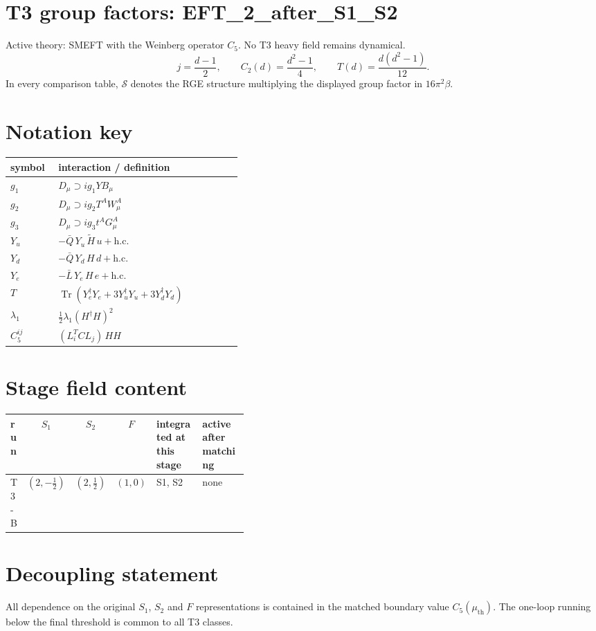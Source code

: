 \documentclass[9pt]{article}
\begin{document}
\section*{T3 group factors: EFT\_2\_after\_S1\_S2}
Active theory: SMEFT with the Weinberg operator $C_5$.  No T3 heavy field remains dynamical.
\[j=\frac{d-1}{2},\qquad C_2(d)=\frac{d^2-1}{4},\qquad T(d)=\frac{d(d^2-1)}{12}.\]
In every comparison table, $\mathcal{S}$ denotes the RGE structure multiplying the displayed group factor in $16\pi^2\beta$.
\section*{Notation key}
\begin{longtable}{@{}p{0.19\linewidth}p{0.73\linewidth}@{}}
\toprule
symbol & interaction / definition \\
\midrule
$g_1$ & $D_\mu\supset i g_1 Y B_\mu$ \\
$g_2$ & $D_\mu\supset i g_2 T^A W_\mu^A$ \\
$g_3$ & $D_\mu\supset i g_3 t^A G_\mu^A$ \\
$Y_u$ & $-\bar Q\,Y_u\,\widetilde H\,u+\mathrm{h.c.}$ \\
$Y_d$ & $-\bar Q\,Y_d\,H\,d+\mathrm{h.c.}$ \\
$Y_e$ & $-\bar L\,Y_e\,H\,e+\mathrm{h.c.}$ \\
$T$ & $\operatorname{Tr}\!\left(Y_e^\dagger Y_e+3Y_u^\dagger Y_u+3Y_d^\dagger Y_d\right)$ \\
$\lambda_1$ & $\frac12\lambda_1(H^\dagger H)^2$ \\
$C_5^{ij}$ & $(L_i^T C L_j)\,H H$ \\
\bottomrule
\end{longtable}
\section*{Stage field content}
\begin{longtable}{@{}lccc p{0.20\linewidth}p{0.20\linewidth}@{}}
\toprule
run & $S_1$ & $S_2$ & $F$ & integrated at this stage & active after matching \\
\midrule
T3-B & $(2,- \frac{1}{2})$ & $(2,\frac{1}{2})$ & $(1,0)$ & S1, S2 & none \\
\bottomrule
\end{longtable}
\section*{Decoupling statement}
All dependence on the original $S_1$, $S_2$ and $F$ representations is contained in the matched boundary value $C_5(\mu_{\mathrm{th}})$.  The one-loop running below the final threshold is common to all T3 classes.
\end{document}

